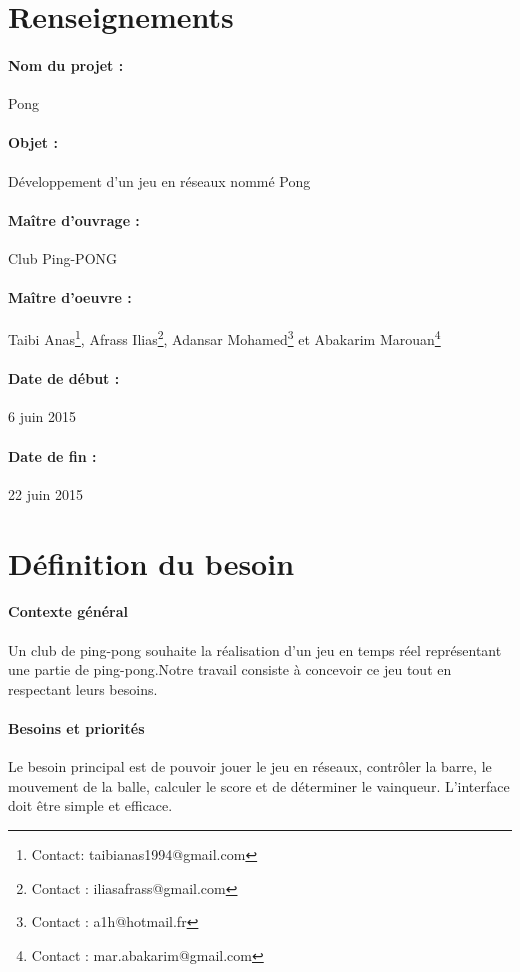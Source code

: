 \documentclass[a4paper,oneside]{article}
\title{\mytitle }
\author{L3 Informatique }
\date{6 juin 2015}
\begin{document}
 	\maketitle
 	\thispagestyle{fancyplain}
 	\section{Renseignements}
 	\paragraph{Nom du projet :}
 	Pong
 	\paragraph{Objet :}
 	Développement d'un jeu en réseaux nommé \og Pong \fg{}
 	\paragraph{Maître d'ouvrage :}
 	Club Ping-PONG
 	\paragraph{Maître d'oeuvre : }
 	Taibi Anas\footnote{Contact: taibianas1994@gmail.com}, Afrass Ilias\footnote{Contact : iliasafrass@gmail.com}, Adansar Mohamed\footnote{Contact : a1h@hotmail.fr} et Abakarim Marouan\footnote{Contact : mar.abakarim@gmail.com}
 	\paragraph{Date de début :}
 	6 juin 2015
 	\paragraph{Date de fin :}
 	22 juin 2015
 	\newpage
 	\section{Définition du besoin}
 	\paragraph{Contexte général\\}
	  Un club de ping-pong souhaite la réalisation d'un jeu en temps réel représentant une partie de ping-pong.Notre travail consiste à concevoir ce jeu tout en respectant leurs besoins.
 
 	\paragraph{Besoins et priorités\\}
 	Le besoin principal est de pouvoir jouer le jeu en réseaux, contrôler la barre, le mouvement de la balle, calculer le score et de déterminer le vainqueur.
 	L'interface doit être simple et efficace.
 	
\end{document}
